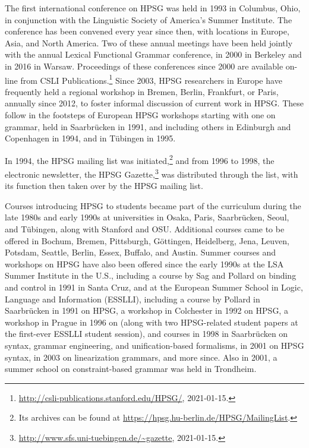 \documentclass[output=paper,biblatex,babelshorthands,newtxmath,draftmode,colorlinks,citecolor=brown]{langscibook}
\begin{document}
The first international conference on HPSG was held in 1993 in Columbus, Ohio, in conjunction with the Linguistic Society of America's Summer Institute.  The conference has been convened every year since then, with locations in Europe, Asia, and North America.  Two of these annual meetings have been held jointly with the annual Lexical Functional Grammar conference, in 2000 in Berkeley and in 2016 in Warsaw.  Proceedings of these conferences since 2000 are available on-line from CSLI Publications.\footnote{\url{http://csli-publications.stanford.edu/HPSG/}, 2021-01-15.}  Since 2003, HPSG researchers in Europe have frequently held a regional workshop in Bremen, Berlin, Frankfurt, or Paris, annually since 2012, to foster informal discussion of current work in HPSG.  These follow in the footsteps of European HPSG workshops starting with one on  grammar, held in Saarbrücken in 1991, and including others in Edinburgh and Copenhagen in 1994, and in Tübingen in 1995.

In 1994, the HPSG mailing list was initiated,\footnote{Its archives can be found at \url{https://hpsg.hu-berlin.de/HPSG/MailingList}.} and from 1996 to 1998, the electronic newsletter, the HPSG Gazette,\footnote{\url{http://www.sfs.uni-tuebingen.de/~gazette}, 2021-01-15.} was distributed through the list, with its function then taken over by the HPSG mailing list.

Courses introducing HPSG to students became part of the curriculum during the late 1980s and early
1990s at universities in Osaka, Paris, Saarbrücken, Seoul, and Tübingen, along with Stanford
and OSU.  Additional courses came to be offered in Bochum, Bremen, Pittsburgh, Göttingen,
Heidelberg, Jena, Leuven, Potsdam, Seattle, Berlin, Essex, Buffalo, and Austin.  Summer courses and workshops on HPSG have also been offered since the early 1990s at the LSA Summer Institute in the U.S., including a course by Sag and Pollard on binding and control in 1991 in Santa Cruz, and at the European Summer School in Logic, Language and Information (ESSLLI), including a course by Pollard in Saarbrücken in 1991 on HPSG, a workshop in Colchester in 1992 on HPSG, a workshop in Prague in 1996 on  (along with two HPSG-related student papers at the first-ever ESSLLI student session), and courses in 1998 in Saarbrücken on  syntax, grammar engineering, and unification-based formalisms, in 2001 on HPSG syntax, in 2003 on linearization grammars, and more since.  Also in 2001, a  summer school on constraint-based grammar was held in Trondheim.
\end{document}
